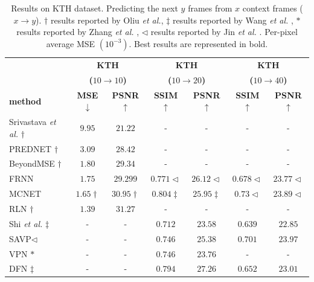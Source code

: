 \begin{table}[!t] 
	\centering
	\footnotesize
	\caption{Results on KTH dataset. Predicting the next $y$ frames from $x$ context frames ($x\rightarrow y$). $\dag$ results reported by Oliu \textit{et al.}\cite{Oliu2018}, $\ddag$ results reported by Wang \textit{et al.} \cite{Wang2019b}, $\ast$ results reported by Zhang \textit{et al.} \cite{Zhang2019}, $\triangleleft$ results reported by Jin \textit{et al.} \cite{Jin2020}. Per-pixel average \ac{MSE} $(10^{-3})$. Best results are represented in bold.}
	\label{table:results_kth}
	\begin{tabular} {@{}lcccccc@{}} 
		\toprule
		& \multicolumn{2}{c}{\textbf{KTH}} &\multicolumn{2}{c}{\textbf{KTH}} & \multicolumn{2}{c}{\textbf{KTH}} \\ 
		& \multicolumn{2}{c}{\textbf{($10\rightarrow10$)}} &\multicolumn{2}{c}{\textbf{($10\rightarrow20$)}} & \multicolumn{2}{c}{\textbf{($10\rightarrow40$)}} \\ 
		\cmidrule{2-3} \cmidrule(lr){4-5} \cmidrule{6-7}
		\textbf{method} & \textbf{\ac{MSE}}$\downarrow$ & \textbf{\ac{PSNR}}$\uparrow$ & \textbf{\ac{SSIM}}$\uparrow$ & \textbf{\ac{PSNR}}$\uparrow$ & \textbf{\ac{SSIM}}$\uparrow$ & \textbf{\ac{PSNR}}$\uparrow$ \\
		\midrule
		Srivastava \textit{et al.} \cite{Srivastava2015}$\dag$ & $9.95$ & $21.22$ & - & - & - & - \\
		\ac{PREDNET} \cite{Lotter2017}$\dag$ & $3.09$ & $28.42$ & - & - & - & - \\
		BeyondMSE \cite{Mathieu2016}$\dag$ & $1.80$ & $29.34$ & - & - & - & - \\
		\acs{FRNN} \cite{Oliu2018} & $1.75$ & $29.299$ & $0.771\triangleleft$ & $26.12\triangleleft$ & $0.678\triangleleft$ & $23.77\triangleleft$ \\
		\ac{MCNET} \cite{Villegas2017a} & $1.65\dag$ & $30.95\dag$ & $0.804\ddag$ & $25.95\ddag$ & $0.73\triangleleft$& $23.89\triangleleft$ \\
		\acs{RLN} \cite{Premont-Schwarz2017}$\dag$ & $\mathbf{1.39}$ & $\mathbf{31.27}$ & - & - & - & - \\
		Shi \textit{et al.} \cite{Shi2015}$\ddag$ & - & - & $0.712$ & $23.58$ & $0.639$ & $22.85$ \\
		\ac{SAVP}\cite{Lee2018}$\triangleleft$ & - & - & $0.746$ & $25.38$ & $0.701$ & $23.97$ \\
		\acs{VPN} \cite{Kalchbrenner2016}$\ast$ & - & - & $0.746$ & $23.76$ & - & - \\
		\ac{DFN} \cite{Brabandere2016}$\ddag$ & - & - & $0.794$ & $27.26$ & $0.652$ & $23.01$ \\

\end{tabular}
\end{table}
